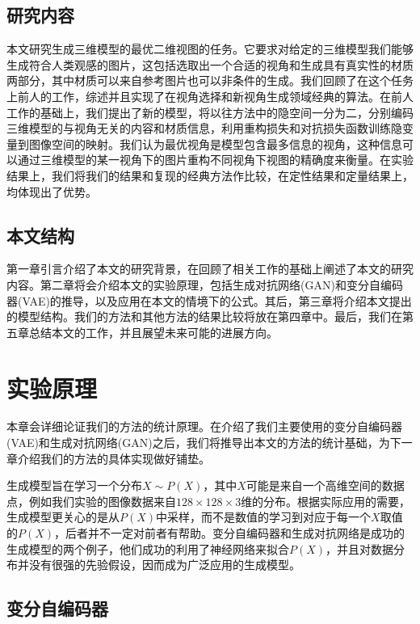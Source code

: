 \documentclass[UTF8,openany,AutoFakeBold,AutoFakeSlant,cs4size]{ctexbook}
\begin{document}
\section{研究内容}

本文研究生成三维模型的最优二维视图的任务。它要求对给定的三维模型我们能够生成符合人类观感的图片，这包括选取出一个合适的视角和生成具有真实性的材质两部分，其中材质可以来自参考图片也可以非条件的生成。我们回顾了在这个任务上前人的工作，综述并且实现了在视角选择和新视角生成领域经典的算法。在前人工作的基础上，我们提出了新的模型，将以往方法中的隐空间一分为二，分别编码三维模型的与视角无关的内容和材质信息，利用重构损失和对抗损失函数训练隐变量到图像空间的映射。我们认为最优视角是模型包含最多信息的视角，这种信息可以通过三维模型的某一视角下的图片重构不同视角下视图的精确度来衡量。在实验结果上，我们将我们的结果和复现的经典方法作比较，在定性结果和定量结果上，均体现出了优势。

\section{本文结构}

第一章引言介绍了本文的研究背景，在回顾了相关工作的基础上阐述了本文的研究内容。第二章将会介绍本文的实验原理，包括生成对抗网络(GAN)和变分自编码器(VAE)的推导，以及应用在本文的情境下的公式。其后，第三章将介绍本文提出的模型结构。我们的方法和其他方法的结果比较将放在第四章中。最后，我们在第五章总结本文的工作，并且展望未来可能的进展方向。



\clearpage

\chapter{实验原理}

本章会详细论证我们的方法的统计原理。在介绍了我们主要使用的变分自编码器(VAE)和生成对抗网络(GAN)之后，我们将推导出本文的方法的统计基础，为下一章介绍我们的方法的具体实现做好铺垫。

生成模型旨在学习一个分布$X \sim P(X)$，其中$X$可能是来自一个高维空间的数据点，例如我们实验的图像数据来自$128 \times 128 \times 3$维的分布。根据实际应用的需要，生成模型更关心的是从$P(X)$中采样，而不是数值的学习到对应于每一个$X$取值的$P(X)$，后者并不一定对前者有帮助。变分自编码器和生成对抗网络是成功的生成模型的两个例子，他们成功的利用了神经网络来拟合$P(X)$，并且对数据分布并没有很强的先验假设，因而成为广泛应用的生成模型。

\section{变分自编码器}
\end{document}
